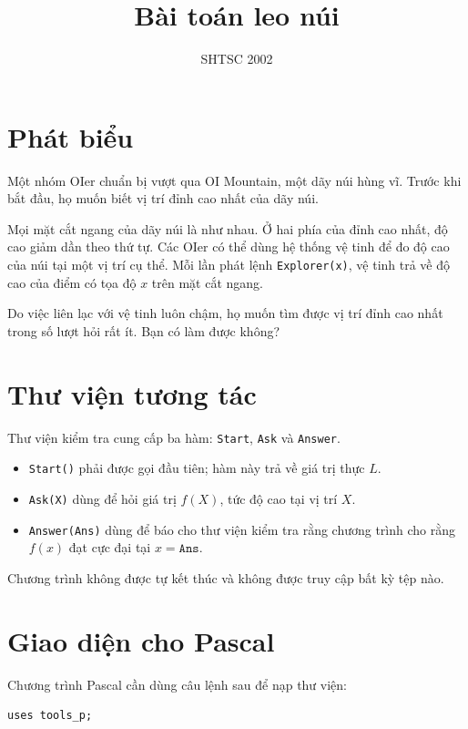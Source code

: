 \documentclass[11pt]{article}
\title{Bài toán leo núi}
\author{SHTSC 2002}
\date{}
\begin{document}
\maketitle


\section{Phát biểu}

Một nhóm OIer chuẩn bị vượt qua OI Mountain, một dãy núi hùng vĩ. Trước khi
bắt đầu, họ muốn biết vị trí đỉnh cao nhất của dãy núi.

Mọi mặt cắt ngang của dãy núi là như nhau. Ở hai phía của đỉnh cao nhất, độ
cao giảm dần theo thứ tự. Các OIer có thể dùng hệ thống vệ tinh để đo độ cao
của núi tại một vị trí cụ thể. Mỗi lần phát lệnh \texttt{Explorer(x)}, vệ
tinh trả về độ cao của điểm có tọa độ \(x\) trên mặt cắt ngang.

Do việc liên lạc với vệ tinh luôn chậm, họ muốn tìm được vị trí đỉnh cao nhất
trong số lượt hỏi rất ít. Bạn có làm được không?

\section{Thư viện tương tác}

Thư viện kiểm tra cung cấp ba hàm: \texttt{Start}, \texttt{Ask} và
\texttt{Answer}.
\begin{itemize}
  \item \texttt{Start()} phải được gọi đầu tiên; hàm này trả về giá trị thực
  \(L\).
  \item \texttt{Ask(X)} dùng để hỏi giá trị \(f(X)\), tức độ cao tại vị trí
  \(X\).
  \item \texttt{Answer(Ans)} dùng để báo cho thư viện kiểm tra rằng chương
  trình cho rằng \(f(x)\) đạt cực đại tại \(x=\texttt{Ans}\).
\end{itemize}
Chương trình không được tự kết thúc và không được truy cập bất kỳ tệp nào.

\section{Giao diện cho Pascal}

Chương trình Pascal cần dùng câu lệnh sau để nạp thư viện:
\begin{verbatim}
uses tools_p;
\end{verbatim}
\end{document}
